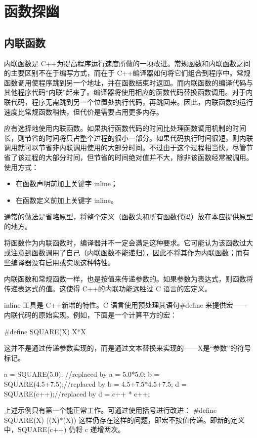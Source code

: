 \chapter{函数探幽}
\section{内联函数}
内联函数是 C++为提高程序运行速度所做的一项改进。常规函数和内联函数之间的主要区别不在于编写方式，而在于 C++编译器如何将它们组合到程序中。常规函数调用使程序跳到另一个地址，并在函数结束时返回。而内联函数的编译代码与其他程序代码“内联”起来了。编译器将使用相应的函数代码替换函数调用。对于内联代码，程序无需跳到另一个位置处执行代码，再跳回来。因此，内联函数的运行速度比常规函数稍快，但代价是需要占用更多内存。

应有选择地使用内联函数。如果执行函数代码的时间比处理函数调用机制的时间长，则节省的时间将只占整个过程的很小一部分。如果代码执行时间很短，则内联调用就可以节省非内联调用使用的大部分时间。不过由于这个过程相当快，尽管节省了该过程的大部分时间，但节省的时间绝对值并不大，除非该函数经常被调用。使用方式：
\begin{itemize}
	\setlength{\itemsep}{0pt}
	\setlength{\parsep}{0pt}
	\setlength{\parskip}{0pt}
	\item 在函数声明前加上关键字 inline；
	\item 在函数定义前加上关键字 inline。
\end{itemize}
通常的做法是省略原型，将整个定义（函数头和所有函数代码）放在本应提供原型的地方。
\begin{marker}
将函数作为内联函数时，编译器并不一定会满足这种要求。它可能认为该函数过大或注意到函数调用了自己（内联函数不能递归），因此不将其作为内联函数；而有些编译器没有启用或实现这种特性。
\end{marker}
内联函数和常规函数一样，也是按值来传递参数的。如果参数为表达式，则函数将传递表达式的值。这使得 C++的内联功能远胜过 C 语言的宏定义。
\begin{tcolorbox}[title=内联与宏,colback=yellow!5!white,center title]
inline 工具是 C++新增的特性。C 语言使用预处理其语句\#define 来提供宏——内联代码的原始实现。例如，下面是一个计算平方的宏：

\#define SQUARE(X) X*X

这并不是通过传递参数实现的，而是通过文本替换来实现的——X是“参数”的符号标记。
\begin{ccode}
a = SQUARE(5.0); //replaced by a = 5.0*5.0;
b = SQUARE(4.5+7.5);//replaced by b = 4.5+7.5*4.5+7.5;
d = SQUARE(c++);//replaced by d = c++ * c++;
\end{ccode}
上述示例只有第一个能正常工作。可通过使用括号进行改进：
\#define SQUARE(X) ((X)*(X))
这样仍存在这样的问题，即宏不按值传递。即新的定义中，SQUARE(c++) 仍将 c 递增两次。
\end{tcolorbox}
